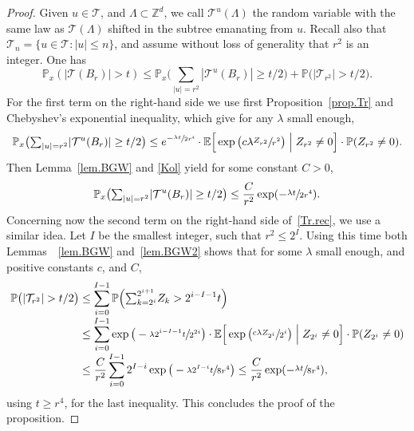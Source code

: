 \documentclass[11pt]{article}
\numberwithin{equation}{section}
\let\ts\textstyle
\theoremstyle{plain}
\theoremstyle{definition}
\newcommand\Z{\mathbb{Z}}
\newcommand{\1}{{\text{\Large $\mathfrak 1$}}}
\begin{document}
\begin{proof}
Given $u\in \mathcal T$, and $\Lambda\subset \Z^d$, we
call $\mathcal T^u(\Lambda)$ the random variable with the same law
as $\mathcal T(\Lambda)$ shifted in the subtree emanating from $u$.
Recall also that \hbox{$\mathcal T_n=\{u\in \mathcal T: |u|\le n\}$}, and assume without loss of generality that $r^2$ is an integer.
One has\vspace*{-3pt}
\begin{equation}\label{Tr.rec}
\mathbb P_x(|\mathcal T(B_r)|>t) \le \mathbb P_x\big({\ts\sum_{|u|=r^2}} |\mathcal T^u(B_r)|\ge t/2\big)+
\mathbb P\big(|\mathcal T_{r^2}|>t/2\big).
\end{equation}
For the first term on the right-hand side we use first Proposition~\ref{prop.Tr} and Chebyshev's exponential inequality,
which give for any $\lambda$ small enough,\vspace*{-3pt}
\[
\mathbb P_x\big({\ts\sum_{|u|=r^2}} |\mathcal T^u(B_r)|\ge t/2\big) \le e^{- \sfrac{\lambda t}{2r^4}} \cdot \mathbb E\Big[\exp\big(c\lambda \sfrac{Z_{r^2}}{r^2}\big)\Bigm|Z_{r^2}\neq 0\Big]\cdot \mathbb P(Z_{r^2}\neq 0).
\]
Then Lemma~\ref{lem.BGW} and \eqref{Kol} yield for some constant $C>0$,\vspace*{-3pt}
\[
\mathbb P_x\big({\ts\sum_{|u|=r^2}} |\mathcal T^u(B_r)|\ge t/2\big)
\le \frac{C}{r^2} \exp(-\sfrac{\lambda t}{2r^4}).
\]
Concerning now the second term on the right-hand side of~\eqref{Tr.rec}, we use a similar idea.
Let $I$ be the smallest integer, such that $r^2\le 2^I$. Using this time both Lemmas~~\ref{lem.BGW} and~\ref{lem.BGW2} shows that
for some $\lambda$ small enough, and positive constants $c$, and $C$,\vspace*{-3pt}
\begin{align*}
\mathbb P\big(|\mathcal T_{r^2}|>t/2\big) & \le \sum_{i=0}^{I-1} \mathbb P\Big({\ts\sum_{k=2^i}^{2^{i+1}}} Z_k >2^{i-I-1} t\Big)\\[-3pt]
& \le \sum_{i=0}^{I-1} \exp\big(-\sfrac{\lambda 2^{i-I-1}t}{2^{2i}}\big)\cdot \mathbb E\Big[\exp\big(\sfrac{c\lambda Z_{2^i}}{2^i}\big)\Bigm|  Z_{2^i}\neq 0\Big]\cdot \mathbb P(Z_{2^i}\neq 0) \\[-3pt]
& \le \frac{C}{r^2} \sum_{i=0}^{I-1}2^{I-i} \exp\big(-\sfrac{\lambda 2^{I-i}t}{8r^4}\big) \le \frac{C}{r^2} \exp(-\sfrac{\lambda t}{8r^4}),
\end{align*}
using $t\ge r^4$, for the last inequality. This concludes the proof of the proposition.
\end{proof}
\end{document}
